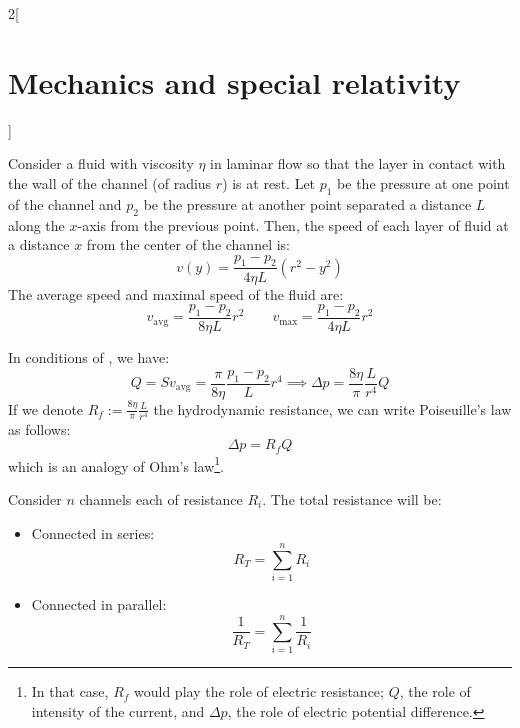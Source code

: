 \documentclass[../../../main_physics.tex]{subfiles}
\begin{document}
\begin{multicols}{2}[\section{Mechanics and special relativity}]
\begin{proposition}[Viscosity]
  \end{proposition}
  \begin{center}
    \begin{minipage}{\linewidth}
      \centering
      
    \end{minipage}
  \end{center}
  \begin{proposition}
    Consider a fluid with viscosity $\eta$ in laminar flow so that the layer in contact with the wall of the channel (of radius $r$) is at rest. Let $p_1$ be the pressure at one point of the channel and $p_2$ be the pressure at another point separated a distance $L$ along the $x$-axis from the previous point. Then, the speed of each layer of fluid at a distance $x$ from the center of the channel is:
    $$v(y)=\frac{p_1-p_2}{4\eta L}(r^2-y^2)$$ The average speed and maximal speed of the fluid are:
    \begin{equation}
      v_\text{avg}=\frac{p_1-p_2}{8\eta L}r^2\qquad v_\text{max}=\frac{p_1-p_2}{4\eta L}r^2
      \label{MSR_eq1}
    \end{equation}
  \end{proposition}
  \begin{proposition}
    In conditions of , we have: $$Q=Sv_\text{avg}=\frac{\pi}{8\eta }\frac{p_1-p_2}{L}r^4\implies\Delta p=\frac{8\eta}{\pi}\frac{L}{r^4}Q$$ If we denote $\displaystyle R_f:=\frac{8\eta}{\pi}\frac{L}{r^4}$ the hydrodynamic resistance, we can write Poiseuille's law as follows: $$\Delta p=R_f Q$$ which is an analogy of Ohm's law\footnote{In that case, $R_f$ would play the role of electric resistance; $Q$, the role of intensity of the current, and $\Delta p$, the role of electric potential difference.}.
  \end{proposition}
  \begin{proposition}
    Consider $n$ channels each of resistance $R_i$. The total resistance will be:
    \begin{itemize}
      \item Connected in series: $$R_T=\sum_{i=1}^nR_i$$
      \item Connected in parallel: $$\frac{1}{R_T}=\sum_{i=1}^n\frac{1}{R_i}$$
    \end{itemize}
  \end{proposition}
  \begin{proposition}

\end{proposition}
\end{multicols}
\end{document}

